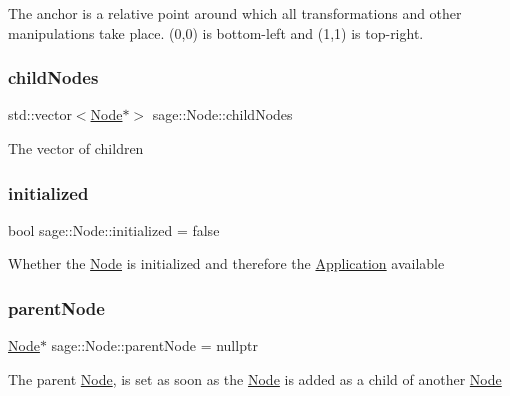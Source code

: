 The anchor is a relative point around which all transformations and other manipulations take place. (0,0) is bottom-\/left and (1,1) is top-\/right. \mbox{\label{classsage_1_1Node_a296882fbf277d09cb672da2275aa5527}} 
\subsubsection{\texorpdfstring{childNodes}{childNodes}}
{\footnotesize\ttfamily std\+::vector$<$\mbox{\hyperlink{classsage_1_1Node}{Node}}$\ast$$>$ sage\+::\+Node\+::child\+Nodes\hspace{0.3cm}{\ttfamily [protected]}}

The vector of children \mbox{\label{classsage_1_1Node_a2c2cf2d54ee6a9368ece7ea46ad13deb}} 
\subsubsection{\texorpdfstring{initialized}{initialized}}
{\footnotesize\ttfamily bool sage\+::\+Node\+::initialized = false\hspace{0.3cm}{\ttfamily [protected]}}

Whether the \mbox{\hyperlink{classsage_1_1Node}{Node}} is initialized and therefore the \mbox{\hyperlink{classsage_1_1Application}{Application}} available \mbox{\label{classsage_1_1Node_a9f6d79896df762b8e8cff9574f1e9262}} 
\subsubsection{\texorpdfstring{parentNode}{parentNode}}
{\footnotesize\ttfamily \mbox{\hyperlink{classsage_1_1Node}{Node}}$\ast$ sage\+::\+Node\+::parent\+Node = nullptr\hspace{0.3cm}{\ttfamily [protected]}}

The parent \mbox{\hyperlink{classsage_1_1Node}{Node}}, is set as soon as the \mbox{\hyperlink{classsage_1_1Node}{Node}} is added as a child of another \mbox{\hyperlink{classsage_1_1Node}{Node}} \mbox{\label{classsage_1_1Node_a7e0ae6eeb84fae60e54e6685c982b0b2}} 
